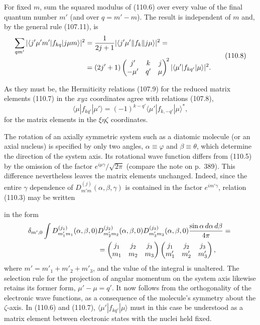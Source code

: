 For fixed $m$, sum the squared modulus of (110.6) over every value of the final quantum number $m'$ (and over $q=m'-m$). The result is independent of $m$ and, by the general rule (107.11), is
\begin{equation}
 \begin{aligned}
 \sum_{qm'}|\langle j'\mu'm'|f_{kq}|j\mu m\rangle|^2
 &={1\over 2j+1}|\langle j'\mu'\|f_k\|j\mu\rangle|^2={}\\
 &=(2j'+1)\begin{pmatrix}j'&k&j\\-\mu'&q'&\mu\end{pmatrix}^{\!2}
 |\langle\mu'|f_{kq'}|\mu\rangle|^2.
 \end{aligned}
 \tag{110.8}
\end{equation}

As they must be, the Hermiticity relations (107.9) for the reduced matrix elements (110.7) in the $xyz$ coordinates agree with relations (107.8),
\[
 \langle\mu|f_{kq'}|\mu'\rangle
 =(-1)^{k-q'}\langle\mu'|f_{k,-q'}|\mu\rangle^*,
\]
for the matrix elements in the $\xi\eta\zeta$ coordinates.

The rotation of an axially symmetric system such as a diatomic molecule (or an axial nucleus) is specified by only two angles, $\alpha\equiv\varphi$ and $\beta\equiv\theta$, which determine the direction of the system axis. Its rotational wave function differs from (110.5) by the omission of the factor $e^{i\mu\gamma}/\sqrt{2\pi}$ (compare the note on p.~389). This difference nevertheless leaves the matrix elements unchanged. Indeed, since the entire $\gamma$ dependence of $D^{(j)}_{m'm}(\alpha,\beta,\gamma)$ is contained in the factor $e^{im'\gamma}$, relation (110.3) may be written

in the form
\[
 \begin{aligned}
 &\delta_{m',0}\int D^{(j_1)}_{m'_1m_1}(\alpha,\beta,0)
 D^{(j_2)}_{m'_2m_2}(\alpha,\beta,0)
 D^{(j_3)}_{m'_3m_3}(\alpha,\beta,0)\frac{\sin\alpha\,d\alpha\,d\beta}{4\pi}={}\\
 &\hspace{35mm}=
 \begin{pmatrix}j_1&j_2&j_3\\m_1&m_2&m_3\end{pmatrix}
 \begin{pmatrix}j_1&j_2&j_3\\m'_1&m'_2&m'_3\end{pmatrix},
 \end{aligned}
\]
where $m'=m'_1+m'_2+m'_3$, and the value of the integral is unaltered. The selection rule for the projection of angular momentum on the system axis likewise retains its former form, $\mu'-\mu=q'$. It now follows from the orthogonality of the electronic wave functions, as a consequence of the molecule's symmetry about the $\zeta$-axis. In (110.6) and (110.7), $\langle\mu'|f_{kq'}|\mu\rangle$ must in this case be understood as a matrix element between electronic states with the nuclei held fixed.
